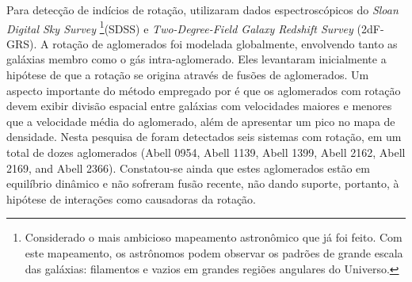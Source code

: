 Para detecção de indícios de rotação,  utilizaram dados espectroscópicos do \textit{Sloan Digital Sky Survey} \footnote{Considerado o mais ambicioso mapeamento astronômico que já foi feito. Com este mapeamento, os astrônomos podem observar os padrões de grande escala das galáxias: filamentos e vazios em grandes regiões angulares do Universo.}(SDSS) e \textit{Two-Degree-Field Galaxy Redshift Survey} (2dF-GRS). A rotação de aglomerados foi modelada globalmente, envolvendo tanto as galáxias membro como o gás intra-aglomerado. Eles levantaram inicialmente a hipótese de que a rotação se origina através de fusões de aglomerados. Um aspecto importante do método empregado por  é que os aglomerados com rotação devem exibir divisão espacial entre galáxias com velocidades maiores e menores que a velocidade média do aglomerado, além de apresentar um pico no mapa de densidade. Nesta pesquisa de  foram detectados seis sistemas com rotação, em um total de dozes aglomerados (Abell 0954, Abell 1139, Abell 1399, Abell 2162, Abell 2169, and Abell 2366). Constatou-se ainda que estes aglomerados estão em equilíbrio dinâmico e não sofreram fusão recente, não dando suporte, portanto, à hipótese de interações como causadoras da rotação. 
	
